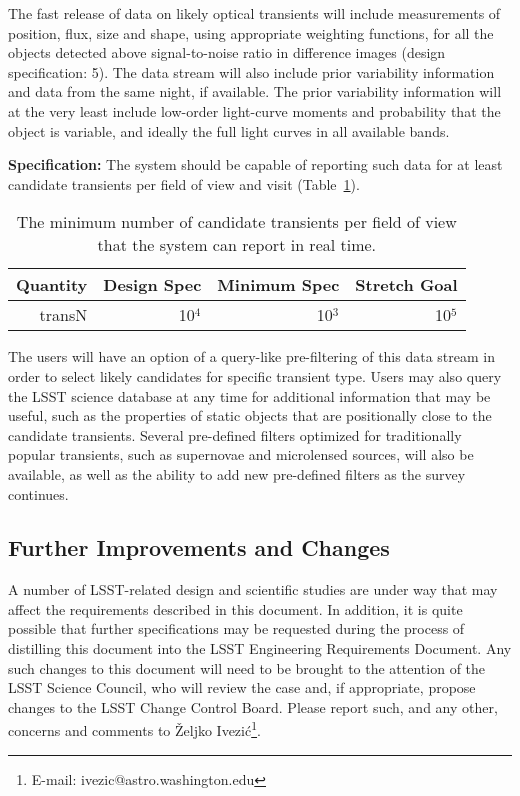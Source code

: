 The fast release of data on likely optical transients will include
measurements of position, flux, size and shape, using appropriate
weighting functions, for all the objects detected above
signal-to-noise ratio in difference images (design specification: 5).
The data stream will also include prior variability information and
data from the same night, if available. The prior variability
information will at the very least include low-order light-curve moments
and probability that the object is variable, and ideally the full
light curves in all available bands.

\textbf{Specification:} The system should be capable of reporting such data for
at least    candidate transients per
field of view and visit (Table~\ref{transN}).
\begin{table}[h]
\begin{tabular}{|r|r|r|r|}
\hline
     Quantity         &   Design Spec & Minimum Spec  & Stretch Goal   \\
\hline
    transN              &       10$^4$    &      10$^3$      &       10$^5$     \\
\hline
\end{tabular}
\caption{The minimum number of candidate transients per field
of view that the system can report in real time.}
\label{transN}
\end{table}

The users
will have an option of a query-like pre-filtering of this data stream
in order to select likely candidates for specific transient type. Users
may also query the LSST science database at any time for additional
information that may be useful, such as the properties of static objects
that are positionally close to the candidate transients.
Several pre-defined filters optimized for traditionally popular transients,
such as supernovae and microlensed sources, will also be available,
as well as the ability to add new pre-defined filters as the survey
continues.


\subsection{Further Improvements and Changes}

A number of LSST-related design and scientific studies are under way that
may affect the requirements described in this document. In addition, it is
quite possible that further specifications may be requested during the
process of distilling this document into the LSST Engineering Requirements
Document. Any such changes to this document will need to be brought to the
attention of the LSST Science Council, who will review the case and, if
appropriate, propose changes to the LSST Change Control Board. Please report
such, and any other, concerns and comments to \v{Z}eljko
Ivezi\'{c}\footnote{E-mail: ivezic@astro.washington.edu}.
